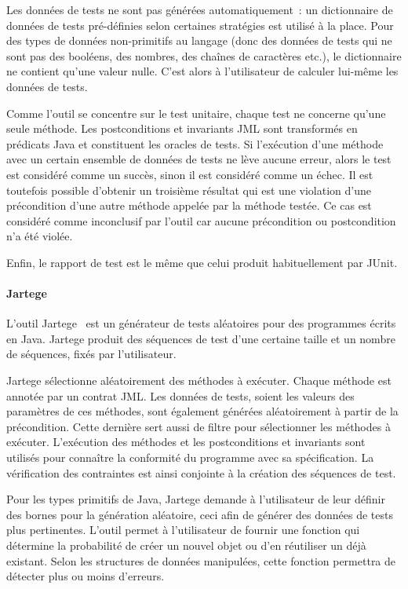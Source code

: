 Les données de tests ne sont pas générées automatiquement~: un dictionnaire de
données de tests pré-définies selon certaines stratégies est utilisé à la place.
Pour des types de données non-primitifs au langage (donc des données de tests
qui ne sont pas des booléens, des nombres, des chaînes de caractères etc.), le
dictionnaire ne contient qu'une valeur nulle. C'est alors à l'utilisateur de
calculer lui-même les données de tests.

Comme l'outil se concentre sur le test unitaire, chaque test ne concerne qu'une
seule méthode. Les postconditions et invariants JML sont transformés en
prédicats Java et constituent les oracles de tests. Si l'exécution d'une méthode
avec un certain ensemble de données de tests ne lève aucune erreur, alors le
test est considéré comme un succès, sinon il est considéré comme un échec. Il
est toutefois possible d'obtenir un troisième résultat qui est une violation
d'une précondition d'une autre méthode appelée par la méthode testée.  Ce cas
est considéré comme inconclusif par l'outil car aucune précondition ou
postcondition n'a été violée.

Enfin, le rapport de test est le même que celui produit habituellement par
JUnit.

\paragraph{Jartege} L'outil Jartege~ est un générateur de tests
aléatoires pour des programmes écrits en Java. Jartege produit des séquences de
test d'une certaine taille et un nombre de séquences, fixés par
l'utilisateur.

Jartege sélectionne aléatoirement des méthodes à exécuter. Chaque méthode est
annotée par un contrat JML. Les données de tests, soient les valeurs des
paramètres de ces méthodes, sont également générées aléatoirement à partir de la
précondition. Cette dernière sert aussi de filtre pour sélectionner les méthodes
à exécuter. L'exécution des méthodes et les postconditions et invariants sont
utilisés pour connaître la conformité du programme avec sa spécification. La
vérification des contraintes est ainsi conjointe à la création des séquences de
test.

Pour les types primitifs de Java, Jartege demande à l'utilisateur de leur
définir des bornes pour la génération aléatoire, ceci afin de générer des
données de tests plus pertinentes. L'outil permet à l'utilisateur de fournir une
fonction qui détermine la probabilité de créer un nouvel objet ou d'en
réutiliser un déjà existant. Selon les structures de données manipulées, cette
fonction permettra de détecter plus ou moins d'erreurs.

